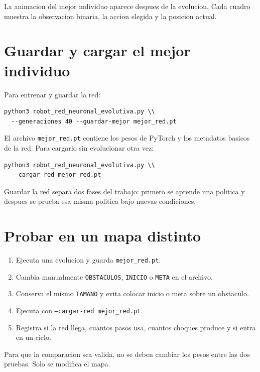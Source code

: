 \documentclass[11pt,a4paper]{article}
\begin{document}
La animacion del mejor individuo aparece despues de la evolucion. Cada cuadro muestra la observacion binaria, la accion elegida y la posicion actual.

\section{Guardar y cargar el mejor individuo}
Para entrenar y guardar la red:

\begin{lstlisting}[style=python]
python3 robot_red_neuronal_evolutiva.py \\
  --generaciones 40 --guardar-mejor mejor_red.pt
\end{lstlisting}

El archivo \texttt{mejor\_red.pt} contiene los pesos de PyTorch y los metadatos basicos de la red. Para cargarlo sin evolucionar otra vez:

\begin{lstlisting}[style=python]
python3 robot_red_neuronal_evolutiva.py \\
  --cargar-red mejor_red.pt
\end{lstlisting}

\begin{idea}
Guardar la red separa dos fases del trabajo: primero se aprende una politica y despues se prueba esa misma politica bajo nuevas condiciones.
\end{idea}

\section{Probar en un mapa distinto}
\begin{enumerate}[leftmargin=*]
  \item Ejecuta una evolucion y guarda \texttt{mejor\_red.pt}.
  \item Cambia manualmente \texttt{OBSTACULOS}, \texttt{INICIO} o \texttt{META} en el archivo.
  \item Conserva el mismo \texttt{TAMANO} y evita colocar inicio o meta sobre un obstaculo.
  \item Ejecuta con \texttt{--cargar-red mejor\_red.pt}.
  \item Registra si la red llega, cuantos pasos usa, cuantos choques produce y si entra en un ciclo.
\end{enumerate}

Para que la comparacion sea valida, no se deben cambiar los pesos entre las dos pruebas. Solo se modifica el mapa.
\end{document}
